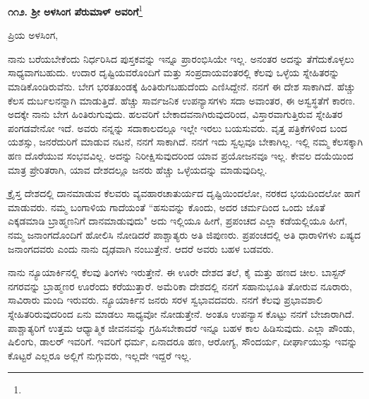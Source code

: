 \begin{center}
\textbf{೧೧೨. ಶ‍್ರೀ ಅಳಸಿಂಗ ಪೆರುಮಾಳ್ ಅವರಿಗೆ}\footnote{}
\end{center}

\vspace{-0.7cm}

\begin{flushright}
{\fontsize{12.5pt}{13pt}\selectfont{ಅಮೆರಿಕಾ\\೨೧ನೇ ಸೆಪ್ಟೆಂಬರ್, ೧೮೯೪}}
\end{flushright}

\vspace{-0.5cm}

\noindent
	ಪ್ರಿಯ ಅಳಸಿಂಗ,

{\fontsize{12.5pt}{13pt}\selectfont{ನಾನು ಬಿಡುವಿಲ್ಲದೆ ಊರಿನಿಂದ ಊರಿಗೆ ಅಲೆಯುತ್ತಾ ಪಾಠಪ್ರವಚನ, ಉಪನ್ಯಾಸಗಳಲ್ಲಿ ನಿರತನಾಗಿರುವೆನು.}}

\newpage

ನಾನು ಬರೆಯಬೇಕೆಂದು ನಿರ್ಧರಿಸಿದ ಪುಸ್ತಕವನ್ನು ಇನ್ನೂ ಪ್ರಾರಂಭಿಸಿಯೇ ಇಲ್ಲ. ಅನಂತರ ಅದನ್ನು ತೆಗೆದುಕೊಳ್ಳಲು ಸಾಧ್ಯವಾಗಬಹುದು. ಉದಾರ ದೃಷ್ಟಿಯವರೊಂದಿಗೆ ಮತ್ತು ಸಂಪ್ರದಾಯವಂತರಲ್ಲಿ ಕೆಲವು ಒಳ್ಳೆಯ ಸ್ನೇಹಿತರನ್ನು ಮಾಡಿಕೊಂಡಿರುವೆನು. ಬೇಗ ಭರತಖಂಡಕ್ಕೆ ಹಿಂತಿರುಗಬಹುದೆಂದು ಎಣಿಸಿದ್ದೇನೆ. ನನಗೆ ಈ ದೇಶ ಸಾಕಾಗಿದೆ. ಹೆಚ್ಚು ಕೆಲಸ ದುರ್ಬಲನನ್ನಾಗಿ ಮಾಡುತ್ತಿದೆ. ಹೆಚ್ಚು ಸಾರ್ವಜನಿಕ ಉಪನ್ಯಾಸಗಳು ಸದಾ ಅವಾಂತರ, ಈ ಅಸ್ವಸ್ಥತೆಗೆ ಕಾರಣ. ಅದಕ್ಕೇ ನಾನು ಬೇಗ ಹಿಂತಿರುಗುವುದು. ಹಲವರಿಗೆ ಬೇಕಾದವನಾಗಿರುವುದರಿಂದ, ವಿಸ್ತಾರವಾಗುತ್ತಿರುವ ಸ್ನೇಹಿತರ ಪಂಗಡವೇನೋ ಇದೆ. ಅವರು ನನ್ನನ್ನು ಸದಾಕಾಲದಲ್ಲೂ ಇಲ್ಲೇ ಇರಲು ಬಯಸುವರು. ವೃತ್ತ ಪತ್ರಿಕೆಗಳಿಂದ ಬಂದ ಯಶಸ್ಸು, ಜನರೆದುರಿಗೆ ಮಾಡುವ ನಟನೆ, ನನಗೆ ಸಾಕಾಗಿದೆ. ನನಗೆ ಇದು ಸ್ವಲ್ಪವೂ ಬೇಕಾಗಿಲ್ಲ. ಇಲ್ಲಿ ನಮ್ಮ ಕೆಲಸಕ್ಕಾಗಿ ಹಣ ದೊರೆಯುವ ಸಂಭವವಿಲ್ಲ. ಅದನ್ನು ನಿರೀಕ್ಷಿಸುವುದರಿಂದ ಯಾವ ಪ್ರಯೋಜನವೂ ಇಲ್ಲ. ಕೇವಲ ದಯೆಯಿಂದ ಮಾತ್ರ ಪ್ರೇರಿತರಾಗಿ, ಯಾವ ದೇಶದಲ್ಲೂ ಜನರು ಹೆಚ್ಚು ಒಳ್ಳೆಯದನ್ನು ಮಾಡುವುದಿಲ್ಲ.

ಕ್ರೈಸ್ತ ದೇಶದಲ್ಲಿ ದಾನಮಾಡುವ ಕೆಲವರು ವ್ಯವಹಾರಚಾತುರ್ಯದ ದೃಷ್ಟಿ\break ಯಿಂದಲೋ, ನರಕದ ಭಯದಿಂದಲೋ ಹಾಗೆ ಮಾಡುವರು. ನಮ್ಮ ಬಂಗಾಳಿಯ ಗಾದೆಯಂತೆ \enginline{-} ``ಹಸುವನ್ನು ಕೊಂದು, ಅದರ ಚರ್ಮದಿಂದ ಒಂದು ಜೊತೆ ಎಕ್ಕಡಮಾಡಿ ಬ್ರಾಹ್ಮಣನಿಗೆ ದಾನಮಾಡುವುದು" \enginline{-} ಅದು ಇಲ್ಲಿಯೂ ಹೀಗೆ, ಪ್ರಪಂಚದ ಎಲ್ಲಾ ಕಡೆಯಲ್ಲಿಯೂ ಹೀಗೆ, ನಮ್ಮ ಜನಾಂಗದೊಂದಿಗೆ ಹೋಲಿಸಿ ನೋಡಿದರೆ ಪಾಶ್ಚಾತ್ಯರು ಅತಿ ಜಿಪುಣರು. ಪ್ರಪಂಚದಲ್ಲಿ ಅತಿ ಧಾರಾಳಿಗಳು ಏಷ್ಯದ ಜನಾಂಗದವರು ಎಂದು ನಾನು ದೃಢವಾಗಿ ನಂಬುತ್ತೇನೆ. ಆದರೆ ಅವರು ಬಹಳ ಬಡವರು.

ನಾನು ನ್ಯೂಯಾರ್ಕಿನಲ್ಲಿ ಕೆಲವು ತಿಂಗಳು ಇರುತ್ತೇನೆ. ಈ ಊರೇ ದೇಶದ ತಲೆ, ಕೈ ಮತ್ತು ಹಣದ ಚೀಲ. ಬಾಸ್ಟನ್ ನಗರವನ್ನು ಬ್ರಾಹ್ಮಣರ ಊರೆಂದು ಕರೆಯುತ್ತಾರೆ. ಅಮೆರಿಕಾ ದೇಶದಲ್ಲಿ ನನಗೆ ಸಹಾನುಭೂತಿ ತೋರುವ ನೂರಾರು, ಸಾವಿರಾರು ಮಂದಿ ಇರುವರು. ನ್ಯೂಯಾರ್ಕಿನ ಜನರು ಸರಳ ಸ್ವಭಾವದವರು. ನನಗೆ ಕೆಲವು ಪ್ರಭಾವಶಾಲಿ ಸ್ನೇಹಿತರಿರುವುದರಿಂದ ಏನು ಮಾಡಲು ಸಾಧ್ಯವೋ ನೋಡುತ್ತೇನೆ. ಅಂತೂ ಉಪನ್ಯಾಸ ಕೊಟ್ಟು ನನಗೆ ಬೇಜಾರಾಗಿದೆ. ಪಾಶ್ಚಾತ್ಯರಿಗೆ ಉತ್ತಮ ಆಧ್ಯಾತ್ಮಿಕ ಜೀವನವನ್ನು ಗ್ರಹಿಸಬೇಕಾದರೆ ಇನ್ನೂ ಬಹಳ ಕಾಲ ಹಿಡಿಸುವುದು. ಎಲ್ಲಾ ಪೌಂಡು, ಷಿಲಿಂಗು, ಡಾಲರ್ ಇವರಿಗೆ. ಇವರಿಗೆ ಧರ್ಮ, ಏನಾದರೂ ಹಣ, ಆರೋಗ್ಯ, ಸೌಂದರ್ಯ, ದೀರ್ಘಾಯುಸ್ಸು ಇವನ್ನು ಕೊಟ್ಟರೆ ಎಲ್ಲರೂ ಅಲ್ಲಿಗೆ ನುಗ್ಗುವರು, ಇಲ್ಲದೇ ಇದ್ದರೆ ಇಲ್ಲ.


